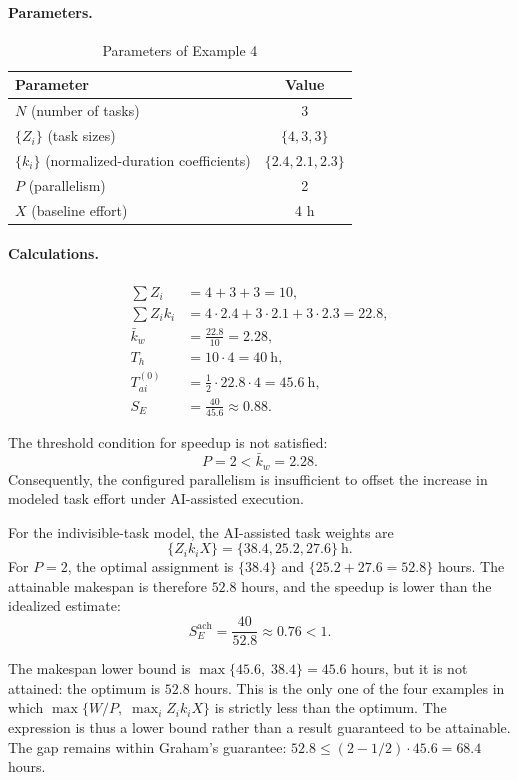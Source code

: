 
\paragraph{Parameters.}
\begin{table}[ht!]
\centering
\caption{Parameters of Example 4}
\label{tab:example-4-params}
\begin{tabular}{lc}
\toprule
Parameter & Value \\
\midrule
$N$ (number of tasks) & 3 \\
$\{Z_i\}$ (task sizes) & $\{4, 3, 3\}$ \\
$\{k_i\}$ (normalized-duration coefficients) & $\{2.4, 2.1, 2.3\}$ \\
$P$ (parallelism) & 2 \\
$X$ (baseline effort) & 4 h \\
\bottomrule
\end{tabular}
\end{table}

\paragraph{Calculations.}
\begin{align*}
  \sum Z_i &= 4 + 3 + 3 = 10, \\
  \sum Z_i k_i &= 4{\cdot}2.4 + 3{\cdot}2.1 + 3{\cdot}2.3 = 22.8, \\
  \bar{k}_w &= \frac{22.8}{10} = 2.28, \\
  T_h &= 10 \cdot 4 = 40~\text{h}, \\
  T_{ai}^{(0)} &= \frac{1}{2} \cdot 22.8 \cdot 4 = 45.6~\text{h}, \\
  S_E &= \frac{40}{45.6} \approx 0.88.
\end{align*}

The threshold condition for speedup is not satisfied:
\[
  P = 2 < \bar{k}_w = 2.28.
\]
Consequently, the configured parallelism is insufficient to offset the
increase in modeled task effort under AI-assisted execution.

For the indivisible-task model, the AI-assisted task weights are
\[
  \{Z_i k_i X\} = \{38.4, 25.2, 27.6\}~\text{h}.
\]
For $P=2$, the optimal assignment is $\{38.4\}$ and
$\{25.2 + 27.6 = 52.8\}$ hours. The attainable makespan is therefore $52.8$
hours, and the speedup is lower than the idealized estimate:
\[
  S_E^{\text{ach}} = \frac{40}{52.8} \approx 0.76 < 1.
\]

The makespan lower bound is $\max\{45.6,\; 38.4\} = 45.6$ hours, but it is not
attained: the optimum is $52.8$ hours. This is the only one of the four
examples in which $\max\{W/P,\; \max_i Z_i k_i X\}$ is strictly less than the
optimum. The expression is thus a lower bound rather than a result guaranteed
to be attainable. The gap remains within Graham's guarantee:
$52.8 \le (2 - 1/2) \cdot 45.6 = 68.4$ hours.

